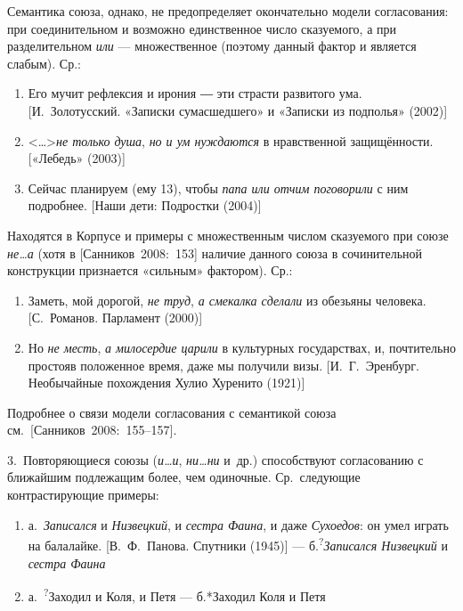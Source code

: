Семантика союза, однако, не предопределяет окончательно модели
согласования: при соединительном и возможно единственное число
сказуемого, а при разделительном \textit{или} --- множественное (поэтому
данный фактор и является слабым). Ср.:

\begin{enumerate}
  \def\labelenumi{(\arabic{enumi})}
  \setcounter{enumi}{105}
  \item
        Его мучит рефлексия и ирония ― эти страсти развитого ума.
        {[}И.~Золотусский. «Записки сумасшедшего» и «Записки из подполья»
        (2002){]}
  \item
        \textless\ldots\textgreater{}\textit{не только душа}, \textit{но и ум
          нуждаются} в нравственной защищённости. {[}«Лебедь» (2003){]}
  \item
        Сейчас планируем (ему 13), чтобы \textit{папа или отчим поговорили} с
        ним подробнее. {[}Наши дети: Подростки (2004){]}
\end{enumerate}

Находятся в Корпусе и примеры с множественным числом сказуемого при
союзе \textit{не\ldots а} (хотя в {[}Санников~2008:~153{]} наличие данного
союза в сочинительной конструкции признается «сильным» фактором). Ср.:

\begin{enumerate}
  \def\labelenumi{(\arabic{enumi})}
  \setcounter{enumi}{108}
  \item
        Заметь, мой дорогой, \textit{не труд}, \textit{а смекалка сделали} из
        обезьяны человека. {[}С.~Романов. Парламент (2000){]}
  \item
        Но \textit{не месть}, \textit{а милосердие царили} в культурных
        государствах, и, почтительно простояв положенное время, даже мы
        получили визы. {[}И.~Г.~Эренбург. Необычайные похождения Хулио
        Хуренито (1921){]}
\end{enumerate}

Подробнее о связи модели согласования с семантикой союза
см.~{[}Санников~2008:~155--157{]}.

3.~Повторяющиеся союзы (\textit{и\ldots и}, \textit{ни\ldots ни} и~др.)
способствуют согласованию с ближайшим подлежащим более, чем одиночные.
Ср.~следующие контрастирующие примеры:

\begin{enumerate}
  \def\labelenumi{(\arabic{enumi})}
  \setcounter{enumi}{110}
  \item
        а.~\textit{Записался} и \textit{Низвецкий}, и \textit{сестра Фаина}, и даже
        \textit{Сухоедов}: он умел играть на балалайке. {[}В.~Ф.~Панова.
        Спутники (1945){]} --- б.\textsuperscript{?}\textit{Записался Низвецкий}
        и \textit{сестра Фаина}
  \item
        а.~\textsuperscript{?}Заходил и Коля, и Петя --- б.*Заходил Коля и Петя
\end{enumerate}

